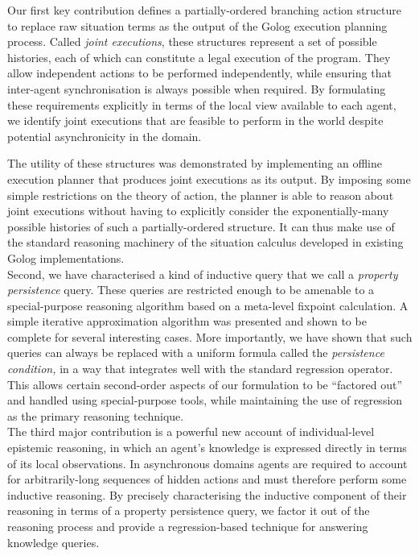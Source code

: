 Our first key contribution defines a partially-ordered branching action
structure to replace raw situation terms as the output of the Golog
execution planning process. Called \emph{joint executions}, these
structures represent a set of possible histories, each of which can
constitute a legal execution of the program. They allow independent
actions to be performed independently, while ensuring that inter-agent
synchronisation is always possible when required. By formulating these
requirements explicitly in terms of the local view available to each
agent, we identify joint executions that are feasible to perform in
the world despite potential asynchronicity in the domain.

The utility of these structures was demonstrated by implementing an
offline execution planner that produces joint executions as its output.
By imposing some simple restrictions on the theory of action, the
planner is able to reason about joint executions without having to
explicitly consider the exponentially-many possible histories of such
a partially-ordered structure. It can thus make use of the standard
reasoning machinery of the situation calculus developed in existing
Golog implementations.\\


Second, we have characterised a kind of inductive query that we call
a \emph{property persistence} query. These queries are restricted
enough to be amenable to a special-purpose reasoning algorithm based
on a meta-level fixpoint calculation. A simple iterative approximation
algorithm was presented and shown to be complete for several interesting
cases. More importantly, we have shown that such queries can always
be replaced with a uniform formula called the \emph{persistence condition,}
in a way that integrates well with the standard regression operator.
This allows certain second-order aspects of our formulation to be
{}``factored out'' and handled using special-purpose tools, while
maintaining the use of regression as the primary reasoning technique.\\


The third major contribution is a powerful new account of individual-level
epistemic reasoning, in which an agent's knowledge is expressed directly
in terms of its local observations. In asynchronous domains agents
are required to account for arbitrarily-long sequences of hidden actions
and must therefore perform some inductive reasoning. By precisely
characterising the inductive component of their reasoning in terms
of a property persistence query, we factor it out of the reasoning
process and provide a regression-based technique for answering knowledge
queries.

